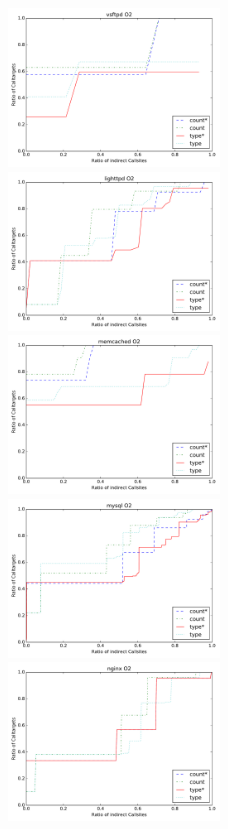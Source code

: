 \begin{figure}
\includegraphics[width=0.5\textwidth]{../MA_Pictures/vsftpd.pdf}
\includegraphics[width=0.5\textwidth]{../MA_Pictures/lighttpd.pdf}\\
\includegraphics[width=0.5\textwidth]{../MA_Pictures/memcached.pdf}
\includegraphics[width=0.5\textwidth]{../MA_Pictures/mysql.pdf}\\
\includegraphics[width=0.5\textwidth]{../MA_Pictures/nginx.pdf}

\end{figure}
